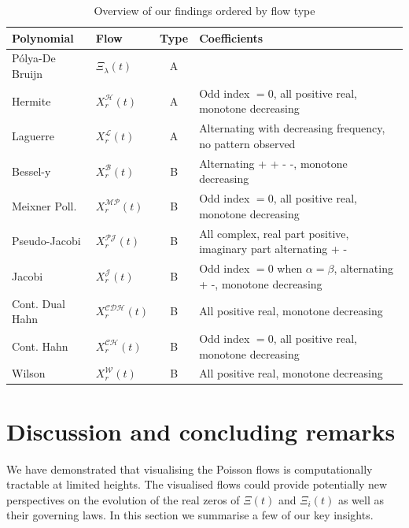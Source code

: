 \documentclass[a4paper,11pt,twoside]{amsart}
\begin{document}
\begin{table}[H]
  \begin{center}
    \caption{Overview of our findings ordered by flow type }
    \label{tab:tablefindings}
    \begin{tabular}{l|l|c|l|} 
      Polynomial & Flow & Type & Coefficients\\
      \hline
      Pólya-De Bruijn & $\Xi_{\lambda}(t)$ & A\\
      Hermite & $X^\mathcal{H}_r(t)$  & A & Odd index $= 0$, all positive real, monotone decreasing\\
      Laguerre & $X^\mathcal{L}_r(t)$  & A & Alternating with decreasing frequency, no pattern observed\\
      Bessel-y & $X^\mathcal{B}_r(t)$  & B & Alternating + + - -, monotone decreasing\\
      Meixner Poll. & $X^\mathcal{MP}_r(t)$  & B & Odd index $= 0$, all positive real, monotone decreasing\\
      Pseudo-Jacobi & $X^\mathcal{PJ}_r(t)$  & B & All complex, real part positive, imaginary part alternating + -\\      
      Jacobi & $X^\mathcal{J}_r(t)$  & B & Odd index $= 0$ when $\alpha = \beta$, alternating + -, monotone decreasing\\
      Cont. Dual Hahn & $X^\mathcal{CDH}_r(t)$  & B & All positive real, monotone decreasing\\
      Cont. Hahn & $X^\mathcal{CH}_r(t)$  & B & Odd index $= 0$, all positive real, monotone decreasing\\
      Wilson & $X^\mathcal{W}_r(t)$  & B & All positive real, monotone decreasing\\
    \end{tabular}
  \end{center}
\end{table}


\section{Discussion and concluding remarks}\label{concremarks}

We have demonstrated that visualising the Poisson flows is computationally tractable at limited heights. The visualised flows could provide potentially new perspectives on the evolution of the real zeros of $\Xi(t)$ and $\Xi_i(t)$ as well as their governing laws. In this section we summarise a few of our key insights.
 
\end{document}
